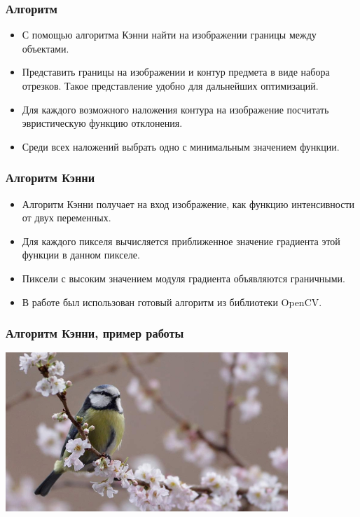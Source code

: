 \begin{frame}\frametitle{Алгоритм}
    \begin{itemize}
        \item С помощью алгоритма Кэнни найти на изображении границы между объектами.
        \pause
        \item Представить границы на изображении и контур предмета в виде набора отрезков.
        Такое представление удобно для дальнейших оптимизаций.
        \pause
        \item Для каждого возможного наложения контура на изображение посчитать эвристическую функцию отклонения.
        \pause
        \item Среди всех наложений выбрать одно с минимальным значением функции.
    \end{itemize}
\end{frame}

\begin{frame}\frametitle{Алгоритм Кэнни}
    \begin{itemize}
        \item Алгоритм Кэнни получает на вход изображение, как функцию интенсивности от двух переменных.
        \pause
        \item Для каждого пикселя вычисляется приближенное значение градиента этой функции в данном пикселе.
        \pause
        \item Пиксели с высоким значением модуля градиента объявляются граничными.
        \pause
        \item В работе был использован готовый алгоритм из библиотеки OpenCV.
    \end{itemize}
\end{frame}

\begin{frame}\frametitle{Алгоритм Кэнни, пример работы}
    \begin{center}
        \includegraphics[height=6cm]{veselov_imgs/image3.jpg}
    \end{center}
\end{frame}

